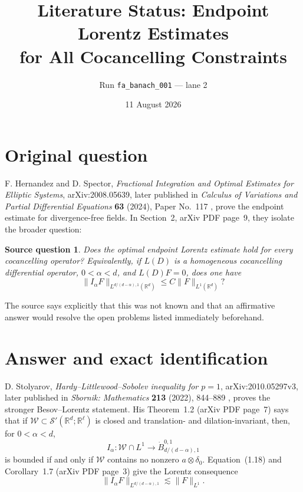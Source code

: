 \documentclass[11pt]{article}
\title{Literature Status: Endpoint Lorentz Estimates\\
for All Cocancelling Constraints}
\author{Run \texttt{fa\_banach\_001} --- lane 2}
\date{11 August 2026}
\newtheorem*{question}{Source question}
\begin{document}
\maketitle

\begin{center}
\end{center}

\section{Original question}

F. Hernandez and D. Spector,
\emph{Fractional Integration and Optimal Estimates for Elliptic Systems},
arXiv:2008.05639, later published in \emph{Calculus of Variations and
Partial Differential Equations} \textbf{63} (2024), Paper No.~117
\cite{source}, prove the endpoint estimate for divergence-free fields.
In Section~2, arXiv PDF page~9, they isolate the broader question:

\begin{question}
Does the optimal endpoint Lorentz estimate hold for every cocancelling
operator?  Equivalently, if $L(D)$ is a homogeneous cocancelling
differential operator, $0<\alpha<d$, and $L(D)F=0$, does one have
\[
  \|I_\alpha F\|_{L^{d/(d-\alpha),1}(\mathbb R^d)}
  \leq C\|F\|_{L^1(\mathbb R^d)}?
\]
\end{question}

The source says explicitly that this was not known and that an affirmative
answer would resolve the open problems listed immediately beforehand.

\section{Answer and exact identification}

D. Stolyarov, \emph{Hardy--Littlewood--Sobolev inequality for $p=1$},
arXiv:2010.05297v3, later published in \emph{Sbornik: Mathematics}
\textbf{213} (2022), 844--889 \cite{stolyarov}, proves the stronger
Besov--Lorentz statement.  His Theorem~1.2 (arXiv PDF page~7) says that if
$\mathcal W\subset\mathcal S'(\mathbb R^d;\mathbb R^\ell)$ is closed and
translation- and dilation-invariant, then, for $0<\alpha<d$,
\[
 I_\alpha:\mathcal W\cap L^1
 \longrightarrow \dot B^{0,1}_{d/(d-\alpha),1}
\]
is bounded if and only if $\mathcal W$ contains no nonzero
$a\otimes\delta_0$.  Equation~(1.18) and Corollary~1.7 (arXiv PDF page~3)
give the Lorentz consequence
\[
  \|I_\alpha F\|_{L^{d/(d-\alpha),1}}
  \lesssim \|F\|_{L^1}.
\]
\end{document}
